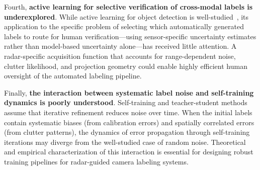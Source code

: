 Fourth, \textbf{active learning for selective verification of cross-modal labels is underexplored}. While active learning for object detection is well-studied~\cite{brust2018active}, its application to the specific problem of selecting which automatically generated labels to route for human verification---using sensor-specific uncertainty estimates rather than model-based uncertainty alone---has received little attention. A radar-specific acquisition function that accounts for range-dependent noise, clutter likelihood, and projection geometry could enable highly efficient human oversight of the automated labeling pipeline.

Finally, \textbf{the interaction between systematic label noise and self-training dynamics is poorly understood}. Self-training and teacher-student methods assume that iterative refinement reduces noise over time. When the initial labels contain systematic biases (from calibration errors) and spatially correlated errors (from clutter patterns), the dynamics of error propagation through self-training iterations may diverge from the well-studied case of random noise. Theoretical and empirical characterization of this interaction is essential for designing robust training pipelines for radar-guided camera labeling systems.
